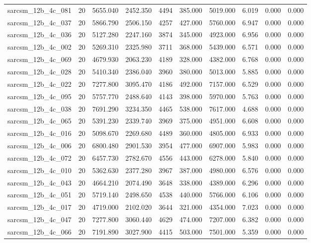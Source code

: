 \begin{tabular}{lrrrrrrrrr}
sarcsm\_12b\_4c\_081 & 20 & 5655.040 & 2452.350 & 4494 & 385.000 & 5019.000 & 6.019 & 0.000 & 0.000 \\
sarcsm\_12b\_4c\_037 & 20 & 5866.790 & 2506.150 & 4257 & 427.000 & 5760.000 & 6.947 & 0.000 & 0.000 \\
sarcsm\_12b\_4c\_036 & 20 & 5127.280 & 2247.160 & 3874 & 345.000 & 4923.000 & 6.956 & 0.000 & 0.000 \\
sarcsm\_12b\_4c\_002 & 20 & 5269.310 & 2325.980 & 3711 & 368.000 & 5439.000 & 6.571 & 0.000 & 0.000 \\
sarcsm\_12b\_4c\_069 & 20 & 4679.930 & 2063.230 & 4189 & 328.000 & 4382.000 & 6.768 & 0.000 & 0.000 \\
sarcsm\_12b\_4c\_028 & 20 & 5410.340 & 2386.040 & 3960 & 380.000 & 5013.000 & 5.885 & 0.000 & 0.000 \\
sarcsm\_12b\_4c\_022 & 20 & 7277.800 & 3095.470 & 4186 & 492.000 & 7157.000 & 6.529 & 0.000 & 0.000 \\
sarcsm\_12b\_4c\_095 & 20 & 5757.770 & 2488.640 & 4143 & 398.000 & 5970.000 & 5.763 & 0.000 & 0.000 \\
sarcsm\_12b\_4c\_038 & 20 & 7691.290 & 3234.350 & 4465 & 538.000 & 7617.000 & 4.688 & 0.000 & 0.000 \\
sarcsm\_12b\_4c\_065 & 20 & 5391.230 & 2339.740 & 3969 & 375.000 & 4951.000 & 6.608 & 0.000 & 0.000 \\
sarcsm\_12b\_4c\_016 & 20 & 5098.670 & 2269.680 & 4489 & 360.000 & 4805.000 & 6.933 & 0.000 & 0.000 \\
sarcsm\_12b\_4c\_006 & 20 & 6800.480 & 2901.530 & 3954 & 477.000 & 6907.000 & 5.983 & 0.000 & 0.000 \\
sarcsm\_12b\_4c\_072 & 20 & 6457.730 & 2782.670 & 4556 & 443.000 & 6278.000 & 5.840 & 0.000 & 0.000 \\
sarcsm\_12b\_4c\_010 & 20 & 5362.630 & 2377.280 & 3967 & 387.000 & 4980.000 & 6.576 & 0.000 & 0.000 \\
sarcsm\_12b\_4c\_043 & 20 & 4664.210 & 2074.490 & 3648 & 338.000 & 4389.000 & 6.296 & 0.000 & 0.000 \\
sarcsm\_12b\_4c\_051 & 20 & 5719.140 & 2498.650 & 4538 & 440.000 & 5766.000 & 6.106 & 0.000 & 0.000 \\
sarcsm\_12b\_4c\_017 & 20 & 4719.000 & 2102.020 & 3644 & 321.000 & 4354.000 & 7.023 & 0.000 & 0.000 \\
sarcsm\_12b\_4c\_047 & 20 & 7277.800 & 3060.440 & 4629 & 474.000 & 7207.000 & 6.382 & 0.000 & 0.000 \\
sarcsm\_12b\_4c\_066 & 20 & 7191.890 & 3027.900 & 4415 & 503.000 & 7501.000 & 5.359 & 0.000 & 0.000 \\

\end{tabular}
